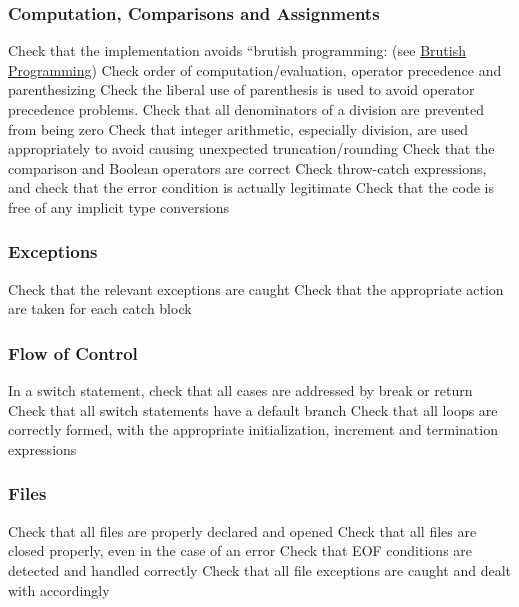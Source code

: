 \subsubsection{Computation, Comparisons and Assignments}
\begin{itemize}
		Check that the implementation avoids “brutish programming: (see \href{http://users.csc.calpoly.edu/~jdalbey/SWE/CodeSmells/bonehead.html}{Brutish Programming})
		Check order of computation/evaluation, operator precedence and parenthesizing
		Check the liberal use of parenthesis is used to avoid operator precedence problems.
		Check that all denominators of a division are prevented from being zero
		Check that integer arithmetic, especially division, are used appropriately to avoid causing unexpected truncation/rounding
		Check that the comparison and Boolean operators are correct
		Check throw-catch expressions, and check that the error condition is actually legitimate
		Check that the code is free of any implicit type conversions
\end{itemize}
%
\subsubsection{Exceptions}
\begin{itemize}
		Check that the relevant exceptions are caught
		Check that the appropriate action are taken for each catch block
\end{itemize}
%
\subsubsection{Flow of Control}
\begin{itemize}
		In a switch statement, check that all cases are addressed by break or return
		Check that all switch statements have a default branch
		Check that all loops are correctly formed, with the appropriate initialization, increment and termination expressions
\end{itemize}
%
\subsubsection{Files}
\begin{itemize}
		Check that all files are properly declared and opened
		Check that all files are closed properly, even in the case of an error
		Check that EOF conditions are detected and handled correctly
		Check that all file exceptions are caught and dealt with accordingly
\end{itemize}
%
